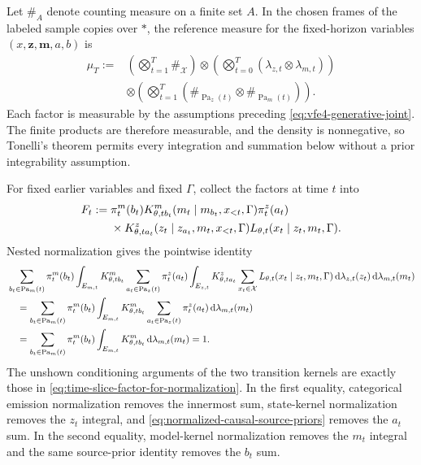 Let $\#_A$ denote counting measure on a finite set $A$. In the chosen frames of the labeled sample copies over $\ast$, the reference measure for the fixed-horizon variables $(x,\boldsymbol z,\boldsymbol m,a,b)$ is
\begin{equation}
\begin{aligned}
\mu_T
:={}&\left(\bigotimes_{t=1}^{T}\#_{\mathcal X}\right)
\otimes\left(\bigotimes_{t=0}^{T}
(\lambda_{z,t}\otimes\lambda_{m,t})\right)\\
&\otimes\left(\bigotimes_{t=1}^{T}
(\#_{\operatorname{Pa}_z(t)}\otimes
\#_{\operatorname{Pa}_m(t)})\right).
\end{aligned}
\label{eq:full-joint-reference-measure}
\end{equation}
Each factor is measurable by the assumptions preceding \cref{eq:vfe4-generative-joint}.  The finite products are therefore measurable, and the density is nonnegative, so Tonelli's theorem permits every integration and summation below without a prior integrability assumption.

For fixed earlier variables and fixed $\Gamma$, collect the factors at time $t$ into
\begin{equation}
\begin{aligned}
F_t
:={}&\pi_t^m(b_t)
K^m_{\theta,tb_t}(m_t\mid m_{b_t},x_{<t},\Gamma)
\pi_t^z(a_t)\\
&\times K^z_{\theta,ta_t}(z_t\mid z_{a_t},m_t,x_{<t},\Gamma)
L_{\theta,t}(x_t\mid z_t,m_t,\Gamma).
\end{aligned}
\label{eq:time-slice-factor-for-normalization}
\end{equation}
Nested normalization gives the pointwise identity
\begin{equation}
\begin{aligned}
&\sum_{b_t\in\operatorname{Pa}_m(t)}\pi_t^m(b_t)
\int_{E_{m,t}}K^m_{\theta,tb_t}
\sum_{a_t\in\operatorname{Pa}_z(t)}\pi_t^z(a_t)
\int_{E_{z,t}}K^z_{\theta,ta_t}
\sum_{x_t\in\mathcal X}L_{\theta,t}(x_t\mid z_t,m_t,\Gamma)
\mathop{\mathrm d\lambda_{z,t}(z_t)}
\mathop{\mathrm d\lambda_{m,t}(m_t)}\\
&\quad=
\sum_{b_t\in\operatorname{Pa}_m(t)}\pi_t^m(b_t)
\int_{E_{m,t}}K^m_{\theta,tb_t}
\sum_{a_t\in\operatorname{Pa}_z(t)}\pi_t^z(a_t)
\mathop{\mathrm d\lambda_{m,t}(m_t)}\\
&\quad=
\sum_{b_t\in\operatorname{Pa}_m(t)}\pi_t^m(b_t)
\int_{E_{m,t}}K^m_{\theta,tb_t}
\mathop{\mathrm d\lambda_{m,t}(m_t)}
=1.
\end{aligned}
\label{eq:time-slice-nested-normalization}
\end{equation}
The unshown conditioning arguments of the two transition kernels are exactly those in \cref{eq:time-slice-factor-for-normalization}.  In the first equality, categorical emission normalization removes the innermost sum, state-kernel normalization removes the $z_t$ integral, and \cref{eq:normalized-causal-source-priors} removes the $a_t$ sum.  In the second equality, model-kernel normalization removes the $m_t$ integral and the same source-prior identity removes the $b_t$ sum.

